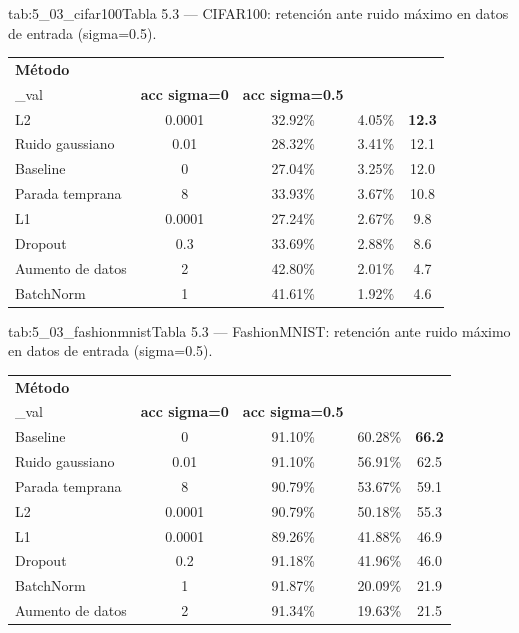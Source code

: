 \begin{table}{tab:5_03_cifar100}{Tabla 5.3 — CIFAR100: retención ante ruido máximo en datos de entrada (sigma=0.5).}
\small
\begin{tabular}{lcccc}
\toprule
\textbf{Método} & \textbf{reg\\_val} & \textbf{acc sigma=0} & \textbf{acc sigma=0.5} & \textbf{Retención (\\%
\midrule
L2 & 0.0001 & 32.92\% & 4.05\% & \textbf{12.3} \\
Ruido gaussiano & 0.01 & 28.32\% & 3.41\% & 12.1 \\
Baseline & 0 & 27.04\% & 3.25\% & 12.0 \\
Parada temprana & 8 & 33.93\% & 3.67\% & 10.8 \\
L1 & 0.0001 & 27.24\% & 2.67\% & 9.8 \\
Dropout & 0.3 & 33.69\% & 2.88\% & 8.6 \\
Aumento de datos & 2 & 42.80\% & 2.01\% & 4.7 \\
BatchNorm & 1 & 41.61\% & 1.92\% & 4.6 \\
\bottomrule
\end{tabular}
\end{table}

\begin{table}{tab:5_03_fashionmnist}{Tabla 5.3 — FashionMNIST: retención ante ruido máximo en datos de entrada (sigma=0.5).}
\small
\begin{tabular}{lcccc}
\toprule
\textbf{Método} & \textbf{reg\\_val} & \textbf{acc sigma=0} & \textbf{acc sigma=0.5} & \textbf{Retención (\\%
\midrule
Baseline & 0 & 91.10\% & 60.28\% & \textbf{66.2} \\
Ruido gaussiano & 0.01 & 91.10\% & 56.91\% & 62.5 \\
Parada temprana & 8 & 90.79\% & 53.67\% & 59.1 \\
L2 & 0.0001 & 90.79\% & 50.18\% & 55.3 \\
L1 & 0.0001 & 89.26\% & 41.88\% & 46.9 \\
Dropout & 0.2 & 91.18\% & 41.96\% & 46.0 \\
BatchNorm & 1 & 91.87\% & 20.09\% & 21.9 \\
Aumento de datos & 2 & 91.34\% & 19.63\% & 21.5 \\
\bottomrule
\end{tabular}
\end{table}